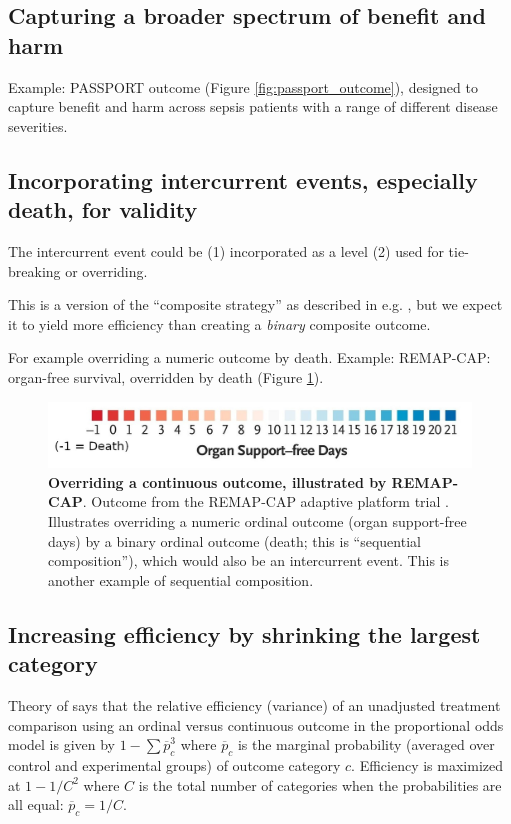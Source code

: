 \documentclass[
  11pt,
  fleqn
]{article}
\begin{document}
\subsection{Capturing a broader spectrum of benefit and harm}

Example: PASSPORT outcome (Figure \ref{fig:passport_outcome}),
designed to capture benefit and harm across sepsis patients with a
range of different disease severities.

\subsection{Incorporating intercurrent events, especially death,
for validity}

The intercurrent event could be (1) incorporated as a level (2) used
for tie-breaking or overriding.

This is a version of the ``composite strategy'' as described in e.g.
\citet{kahanEstimandsFrameworkPrimer2024}, but we expect it to yield
more efficiency than creating a \emph{binary} composite outcome.

For example overriding a numeric outcome by death.
Example: REMAP-CAP: organ-free survival, overridden by death
(Figure \ref{fig:remap_cap_override}).

\begin{figure}
  \includegraphics[width=5in]{remap_outcome_extra_cropped.jpg}
  \caption{\textbf{Overriding a continuous outcome, illustrated by
    REMAP-CAP}. Outcome from the REMAP-CAP adaptive
    platform trial
    \citep{theremap-capinvestigatorsInterleukin6ReceptorAntagonists2021}.
    Illustrates overriding a numeric ordinal outcome (organ
    support-free days) by a binary ordinal outcome (death; this is
    ``sequential composition''), which
    would also be an intercurrent event. This is another example of
  sequential composition.}
  \label{fig:remap_cap_override}
\end{figure}

\subsection{Increasing efficiency by shrinking the largest category}

Theory of \citep{whiteheadSampleSizeCalculations1993} says that the relative
efficiency (variance) of an unadjusted treatment comparison using an ordinal
versus continuous outcome in the proportional odds model is given
by $1 - \sum
\overline p_c^3$ where $\overline p_c$ is the marginal probability (averaged
over control and experimental groups) of outcome category $c$.
Efficiency is maximized at $1 - 1/C^2$ where $C$ is the total number of
categories when the probabilities are all equal: $\overline p_c = 1/C$.
\end{document}
